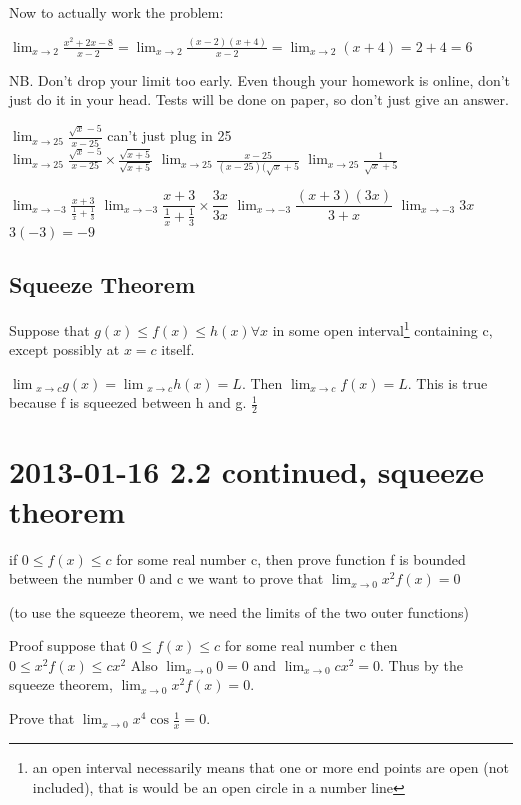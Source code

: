 \documentclass[12pt]{article}
\begin{document}
Now to actually work the problem:

$
\lim_{x \to 2}\frac{x^2 +2x-8}{x-2} = \lim_{x \to 2}\frac{(x-2)(x+4)}{x-2} = \lim_{x \to 2}(x+4) = 2+4 = 6
$

NB. Don't drop your limit too early. Even though your homework is online, don't just do it in your head. Tests
will be done on paper, so don't just give an answer.


$\lim_{x \to 25}\frac{\sqrt{x}-5}{x - 25}$ can't just plug in 25\\
$\lim_{x \to 25}\frac{\sqrt{x}-5}{x - 25} \times \frac{\sqrt{x + 5}}{\sqrt{x + 5}}$
$\lim_{x \to 25}\frac{x-25}{(x - 25)(\sqrt{x}+5}$
$\lim_{x \to 25}\frac{1}{\sqrt{x}+5}$

$\lim_{x \to -3}\frac{x+3}{\frac{1}{x}+\frac{1}{3}}$
$\lim_{x \to -3}\dfrac{x+3}{\frac{1}{x}+\frac{1}{3}} \times \dfrac{3x}{3x}$
$\lim_{x \to -3} \dfrac{(x+3)(3x)}{3+x}$
$\lim_{x \to -3} 3x$
$3(-3) = -9$

\subsection{Squeeze Theorem}

Suppose that $g(x) \leq f(x) \leq h(x) \forall x$ in some open interval\footnote{an open interval necessarily
  means that one or more end points are open (not included), that is would be an open circle in a number line} containing c, except possibly at $x=c$
itself.

$\lim{_{x \to c}}g(x) = \lim{_{x \to c}}h(x) = L$. Then  $\lim_{x \to c}f(x) = L$.
This is true because f is squeezed between h and g.
$\frac{1}{2}$

\section{2013-01-16 2.2 continued, squeeze theorem}

if $0 \leq f(x) \leq c$ for some real number c, then prove
function f is bounded between the number 0 and c
we want to prove that $\lim_{x \to 0} x^2f(x) = 0$

(to use the squeeze theorem, we need the limits of the two outer functions)

Proof
suppose that  $0 \leq f(x) \leq c$ for some real number c then
$0 \leq x^2f(x) \leq cx^2$ Also $\lim_{x \to 0}0 = 0$ and $\lim_{x \to 0}cx^2 = 0$. Thus by the squeeze
theorem, $\lim_{x \to 0}x^2f(x) = 0$.

Prove that $\lim_{x \to 0}x^4 \cos \frac{1}{x} = 0$.
\end{document}
